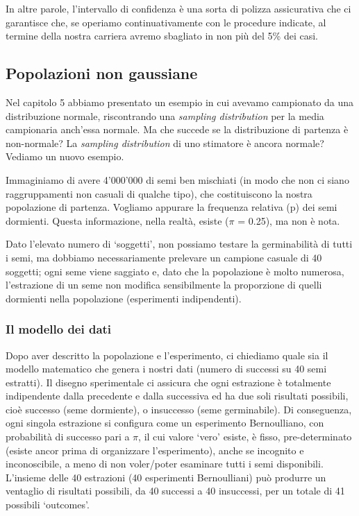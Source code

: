 \documentclass[a4paper,12pt,oneside]{book}
\theoremstyle{definition}
\theoremstyle{definition}
\theoremstyle{definition}
\theoremstyle{remark}
\begin{document}
In altre parole, l'intervallo di confidenza è una sorta di polizza
assicurativa che ci garantisce che, se operiamo continuativamente con le
procedure indicate, al termine della nostra carriera avremo sbagliato in
non più del 5\% dei casi.

\subsection{Popolazioni non gaussiane}\label{popolazioni-non-gaussiane}

Nel capitolo 5 abbiamo presentato un esempio in cui avevamo campionato
da una distribuzione normale, riscontrando una \emph{sampling
distribution} per la media campionaria anch'essa normale. Ma che succede
se la distribuzione di partenza è non-normale? La \emph{sampling
distribution} di uno stimatore è ancora normale? Vediamo un nuovo
esempio.

Immaginiamo di avere 4'000'000 di semi ben mischiati (in modo che non ci
siano raggruppamenti non casuali di qualche tipo), che costituiscono la
nostra popolazione di partenza. Vogliamo appurare la frequenza relativa
(p) dei semi dormienti. Questa informazione, nella realtà, esiste
(\(\pi\) = 0.25), ma non è nota.

Dato l'elevato numero di `soggetti', non possiamo testare la
germinabilità di tutti i semi, ma dobbiamo necessariamente prelevare un
campione casuale di 40 soggetti; ogni seme viene saggiato e, dato che la
popolazione è molto numerosa, l'estrazione di un seme non modifica
sensibilmente la proporzione di quelli dormienti nella popolazione
(esperimenti indipendenti).

\subsubsection{Il modello dei dati}\label{il-modello-dei-dati-1}

Dopo aver descritto la popolazione e l'esperimento, ci chiediamo quale
sia il modello matematico che genera i nostri dati (numero di successi
su 40 semi estratti). Il disegno sperimentale ci assicura che ogni
estrazione è totalmente indipendente dalla precedente e dalla successiva
ed ha due soli risultati possibili, cioè successo (seme dormiente), o
insuccesso (seme germinabile). Di conseguenza, ogni singola estrazione
si configura come un esperimento Bernoulliano, con probabilità di
successo pari a \(\pi\), il cui valore `vero' esiste, è fisso,
pre-determinato (esiste ancor prima di organizzare l'esperimento), anche
se incognito e inconoscibile, a meno di non voler/poter esaminare tutti
i semi disponibili. L'insieme delle 40 estrazioni (40 esperimenti
Bernoulliani) può produrre un ventaglio di risultati possibili, da 40
successi a 40 insuccessi, per un totale di 41 possibili `outcomes'.
\end{document}
